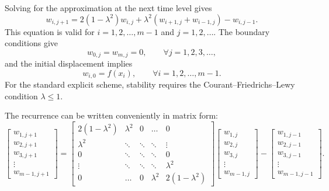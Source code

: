 \documentclass[a4paper]{article}
\begin{document}
Solving for the approximation at the next time level gives
\begin{equation}\label{eq::difference_equation_3}
w_{i,j+1}=2(1-\lambda^2)w_{i,j}+\lambda^2\left(w_{i+1,j}+w_{i-1,j}\right)-w_{i,j-1}.
\end{equation}
This equation is valid for $i=1,2,\ldots,m-1$ and $j=1,2,\ldots$. The boundary conditions give
\begin{equation}\label{eq::condition_1}
w_{0,j}=w_{m,j}=0,\qquad \forall j=1,2,3,\ldots,
\end{equation}
and the initial displacement implies
\begin{equation}
w_{i,0}=f(x_i),\qquad \forall i=1,2,\ldots,m-1.
\end{equation}
For the standard explicit scheme, stability requires the Courant--Friedrichs--Lewy condition $\lambda\leq 1$.

The recurrence can be written conveniently in matrix form:
\begin{equation}\label{eq::matrix_difference_equation}
\begin{bmatrix}
w_{1,j+1}\\
w_{2,j+1}\\
w_{3,j+1}\\
\vdots\\
w_{m-1,j+1}
\end{bmatrix}
=
\begin{bmatrix}
2(1-\lambda^2)&\lambda^2&0&\dots&0\\
\lambda^2&\ddots&\ddots&\ddots&\vdots\\
0&\ddots&\ddots&\ddots&0\\
\vdots&\ddots&\ddots&\ddots&\lambda^2\\
0&\dots&0&\lambda^2&2(1-\lambda^2)
\end{bmatrix}
\begin{bmatrix}
w_{1,j}\\
w_{2,j}\\
w_{3,j}\\
\vdots\\
w_{m-1,j}
\end{bmatrix}
-
\begin{bmatrix}
w_{1,j-1}\\
w_{2,j-1}\\
w_{3,j-1}\\
\vdots\\
w_{m-1,j-1}
\end{bmatrix}.
\end{equation}
\end{document}
